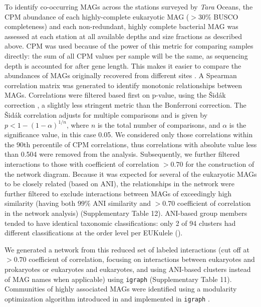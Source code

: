 \documentclass[12pt]{article}
\numberwithin{equation}{section}
\begin{document}
To identify co-occurring MAGs across the stations surveyed by \textit{Tara} Oceans, the CPM abundance of each highly-complete eukaryotic MAG ($>30\%$ BUSCO completeness) and each non-redundant, highly complete bacterial MAG was assessed at each station at all available depths and size fractions as described above. CPM was used because of the power of this metric for comparing samples directly: the sum of all CPM values per sample will be the same, as sequencing depth is accounted for after gene length. This makes it easier to compare the abundances of MAGs originally recovered from different sites \citep{Gradoville_2017}. A Spearman correlation matrix was generated to identify monotonic relationships between MAGs. Correlations were filtered based first on p-value, using the Šidák correction \citep{Sidak_1967}, a slightly less stringent metric than the Bonferroni correction. The Šidák correlation adjusts for multiple comparisons and is given by $p < 1-(1-\alpha)^{1/n}$, where $n$ is the total number of comparisons, and $\alpha$ is the significance value, in this case 0.05. We considered only those correlations within the 90th percentile of CPM correlations, thus correlations with absolute value less than 0.504 were removed from the analysis. Subsequently, we further filtered interactions to those with coefficient of correlation $>0.70$ for the construction of the network diagram. Because it was expected for several of the eukaryotic MAGs to be closely related (based on ANI), the relationships in the network were further filtered to exclude interactions between MAGs of exceedingly high similarity (having both $99\%$ ANI similarity and $>0.70$ coefficient of correlation in the network analysis) (Supplementary Table 12). ANI-based group members tended to have identical taxonomic classifications: only 2 of 94 clusters had different classifications at the order level per EUKulele (). 

We generated a network from this reduced set of labeled interactions (cut off at $>0.70$ coefficient of correlation, focusing on interactions between eukaryotes and prokaryotes or eukaryotes and eukaryotes, and using ANI-based clusters instead of MAG names when applicable) using \texttt{igraph} \citep{igraph,teamr} (Supplementary Table 11). Communities of highly associated MAGs were identified using a modularity optimization algorithm introduced in \cite{blondel2008fast} and implemented in \texttt{igraph} \citep{igraph}.
\end{document}
